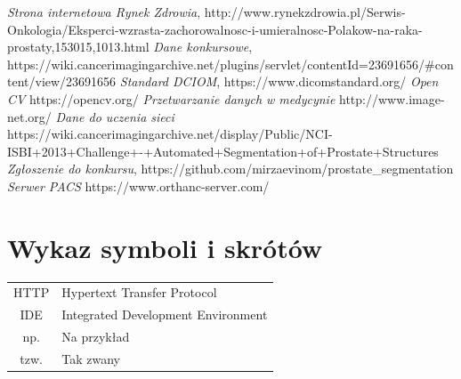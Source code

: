 \documentclass[a4paper,11pt,twoside]{report}
\theoremstyle{definition}
\begin{document}
\begin{thebibliography}{20}%

 \emph{Strona internetowa Rynek Zdrowia}, http://www.rynekzdrowia.pl/Serwis-Onkologia/Eksperci-wzrasta-zachorowalnosc-i-umieralnosc-Polakow-na-raka-prostaty,153015,1013.html
 \emph{Dane konkursowe}, https://wiki.cancerimagingarchive.net/plugins/servlet/contentId=23691656/\#content/view/23691656
 \emph {Standard DCIOM}, https://www.dicomstandard.org/
 \emph {Open CV} https://opencv.org/
 \emph {Przetwarzanie danych w medycynie} http://www.image-net.org/
 \emph {Dane do uczenia sieci }https://wiki.cancerimagingarchive.net/display/Public/NCI-ISBI+2013+Challenge+-+Automated+Segmentation+of+Prostate+Structures
 \emph{Zgłoszenie do konkursu}, https://github.com/mirzaevinom/prostate\_segmentation
  \emph{Serwer PACS} https://www.orthanc-server.com/
\end{thebibliography}
\thispagestyle{empty}


\chapter*{Wykaz symboli i skrótów}

\begin{tabular}{cl}
HTTP & Hypertext Transfer Protocol \\
IDE & Integrated Development Environment \\
np. & Na przykład \\
tzw. & Tak zwany \\
\end{tabular}
\thispagestyle{empty}


\listoffigures
\thispagestyle{empty}


\renewcommand{\listtablename}{Spis tabel}
\listoftables
\thispagestyle{empty}
\end{document}
